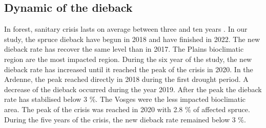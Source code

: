 \documentclass[3p,procedia]{elsarticle}
\begin{document}
\subsection{Dynamic of the dieback}
In forest, sanitary crisis lasts on average between three and ten years \citep{brunier_guide_2020}.
In our study, the spruce dieback have begun in 2018 and have finished in 2022.
The new dieback rate has recover the same level than in 2017.
The Plains bioclimatic region are the most impacted region.
During the six year of the study, the new dieback rate has increased until it reached the peak of the crisis in 2020.
In the Ardenne, the peak reached directly in 2018 during the first drought period.
A decrease of the dieback occurred during the year 2019.
After the peak the dieback rate has stabilised below 3 \%.
The Vosges were the less impacted bioclimatic area. 
The peak of the crisis was reached in 2020 with 2.8 \% of affected spruce.
During the five years of the crisis, the new dieback rate remained below 3 \%.
\end{document}
